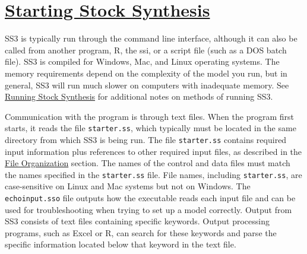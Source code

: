\pagebreak

\hypertarget{StartingSS3}{}
\section[Starting Stock Synthesis]{\protect\hyperlink{StartingSS3}{Starting Stock Synthesis}}
SS3 is typically run through the command line interface, although it can also be called from another program, R, the \gls{ssi}, or a script file (such as a DOS batch file). SS3 is compiled for Windows, Mac, and Linux operating systems. The memory requirements depend on the complexity of the model you run, but in general, SS3 will run much slower on computers with inadequate memory. See \hyperref[sec:RunningSS3]{Running Stock Synthesis} for additional notes on methods of running SS3.

Communication with the program is through text files. When the program first starts, it reads the file \texttt{starter.ss}, which typically must be located in the same directory from which SS3 is being run. The file \texttt{starter.ss} contains required input information plus references to other required input files, as described in the \hyperref[FileOrganization]{File Organization} section. The names of the control and data files must match the names specified in the \texttt{starter.ss} file. File names, including \texttt{starter.ss}, are case-sensitive on Linux and Mac systems but not on Windows. The \texttt{echoinput.sso} file outputs how the executable reads each input file and can be used for troubleshooting when trying to set up a model correctly. Output from SS3 consists of text files containing specific keywords. Output processing programs, such as Excel or R, can search for these keywords and parse the specific information located below that keyword in the text file.

\pagebreak
